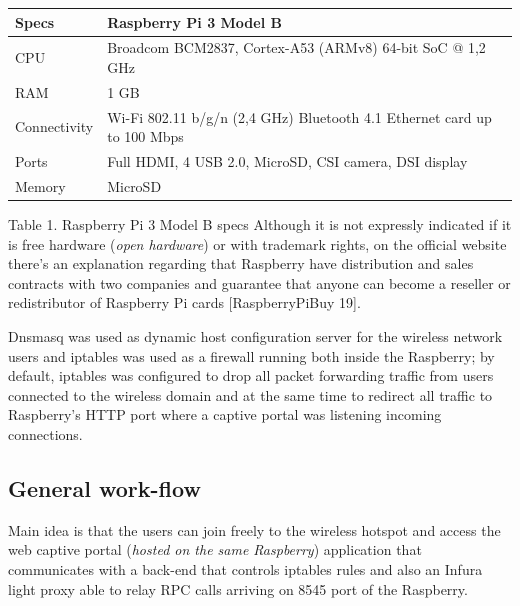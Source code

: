 \documentclass[12pt]{amsart}
\begin{document}
\begin{multicols}{2}
\begin{center}
\begin{tabular}{ | m{} | m{} | }
 \hline
 Specs & Raspberry Pi 3 Model B \\
 \hline
 CPU & Broadcom BCM2837, Cortex-A53 (ARMv8) 64-bit SoC @ 1,2 GHz \\
\hline
 RAM & 1 GB \\
\hline
 Connectivity & Wi-Fi 802.11 b/g/n (2,4 GHz) Bluetooth 4.1 Ethernet card up to 100 Mbps \\
\hline
 Ports & Full HDMI, 4 USB 2.0, MicroSD, CSI camera, DSI display \\
\hline
 Memory & MicroSD \\
\hline
\end{tabular}
\end{center}
\vspace{0.15cm}
Table 1. Raspberry Pi 3 Model B specs
Although it is not expressly indicated if it is free hardware
(\textit{open hardware}) or with trademark rights, on the
official website there's an explanation regarding
that Raspberry have distribution and sales contracts with
two companies and guarantee that anyone can become a reseller or
redistributor of Raspberry Pi cards [RaspberryPiBuy 19].

\vspace{0.35cm}

Dnsmasq\cite{dnsmasq} was used
as dynamic host configuration server for the wireless
network users and
iptables\cite{iptables} was used as a firewall running
both inside the Raspberry; by default, iptables
was configured to
drop all packet
forwarding traffic from users connected to the wireless
domain and at the same time to redirect all
traffic to Raspberry's HTTP port where a
captive portal was listening incoming connections.


\subsection{General work-flow}

\vspace{0.35cm}

Main idea is that the users can join freely
to the wireless hotspot and access the web captive portal
(\textit{hosted on the same Raspberry}) application that
communicates with a back-end that controls iptables
rules and also an Infura light proxy able to relay RPC
calls arriving on 8545 port of the Raspberry.


\end{multicols}
\end{document}
